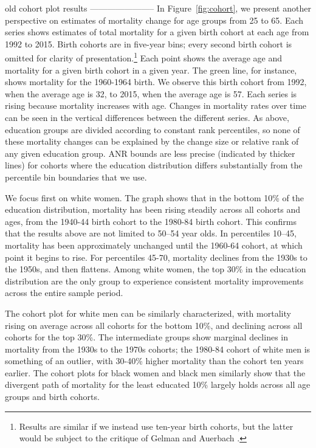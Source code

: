 \begin{center}
old cohort plot results
-----------------------
In Figure~\ref{fig:cohort}, we present another perspective on estimates of mortality
change for age groups from 25 to 65. Each series shows estimates of
total mortality for a given birth cohort at each age from 1992 to
2015. Birth cohorts are in five-year bins; every second birth cohort
is omitted for clarity of presentation.\footnote{Results are similar
  if we instead use ten-year birth cohorts, but the latter would be
  subject to the critique of Gelman and Auerbach \cite{Gelman2016}.}
Each point shows the average age and mortality for a given birth
cohort in a given year.  The green line, for instance, shows mortality
for the 1960-1964 birth. We observe this birth cohort from 1992, when
the average age is 32, to 2015, when the average age is 57. Each
series is rising because mortality increases with age. Changes in
mortality rates over time can be seen in the vertical differences
between the different series. As above, education groups are divided
according to constant rank percentiles, so none of these mortality
changes can be explained by the change size or relative rank of any
given education group. ANR bounds are less precise (indicated by
thicker lines) for cohorts where the
education distribution differs substantially from the percentile bin
boundaries that we use.

We focus first on white women. The graph shows that in the bottom 10\%
of the education distribution, mortality has been rising steadily
across all cohorts and ages, from the 1940-44 birth cohort to the
1980-84 birth cohort. This confirms that the results above are not
limited to 50--54 year olds. In percentiles 10--45, mortality has been
approximately unchanged until the 1960-64 cohort, at which point it
begins to rise. For percentiles 45-70, mortality declines from the
1930s to the 1950s, and then flattens. Among white women, the top 30\%
in the education distribution are the only group to experience
consistent mortality improvements across the entire sample period.

The cohort plot for white men can be similarly characterized, with
mortality rising on average across all cohorts for the bottom 10\%,
and declining across all cohorts for the top 30\%. The intermediate
groups show marginal declines in mortality from the 1930s to the 1970s
cohorts; the 1980-84 cohort of white men is something of an outlier,
with 30-40\% higher mortality than the cohort ten years earlier.
The cohort plots for black women and black men similarly show that the
divergent path of mortality for the least educated 10\% largely holds
across all age groups and birth cohorts. 


\end{center}

